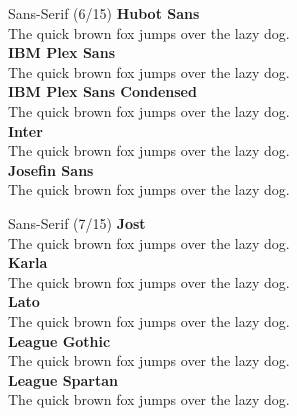 \documentclass[10pt]{beamer}
\begin{document}
\begin{frame}{Sans-Serif (6/15)}
\vspace{-0.2cm}
  {\HubotSansLocal\Large\bfseries Hubot Sans\\}
  {\HubotSansLocal The quick brown fox jumps over the lazy dog.\\[0.3cm]}
  {\IBMPlexSansLocal\Large\bfseries IBM Plex Sans\\}
  {\IBMPlexSansLocal The quick brown fox jumps over the lazy dog.\\[0.3cm]}
  {\IBMPlexSansCondensedLocal\Large\bfseries IBM Plex Sans Condensed\\}
  {\IBMPlexSansCondensedLocal The quick brown fox jumps over the lazy dog.\\[0.3cm]}
  {\InterLocal\Large\bfseries Inter\\}
  {\InterLocal The quick brown fox jumps over the lazy dog.\\[0.3cm]}
  {\JosefinSansLocal\Large\bfseries Josefin Sans\\}
  {\JosefinSansLocal The quick brown fox jumps over the lazy dog.\\[0.3cm]}
\end{frame}

\begin{frame}{Sans-Serif (7/15)}
\vspace{-0.2cm}
  {\JostLocal\Large\bfseries Jost\\}
  {\JostLocal The quick brown fox jumps over the lazy dog.\\[0.3cm]}
  {\KarlaLocal\Large\bfseries Karla\\}
  {\KarlaLocal The quick brown fox jumps over the lazy dog.\\[0.3cm]}
  {\LatoLocal\Large\bfseries Lato\\}
  {\LatoLocal The quick brown fox jumps over the lazy dog.\\[0.3cm]}
  {\LeagueGothicLocal\Large\bfseries League Gothic\\}
  {\LeagueGothicLocal The quick brown fox jumps over the lazy dog.\\[0.3cm]}
  {\LeagueSpartanLocal\Large\bfseries League Spartan\\}
  {\LeagueSpartanLocal The quick brown fox jumps over the lazy dog.\\[0.3cm]}
\end{frame}
\end{document}
